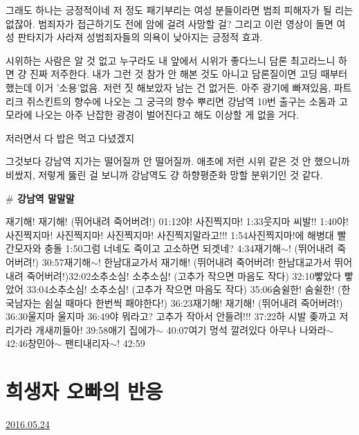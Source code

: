 그래도 하나는 긍정적이네
저 정도 패기부리는 여성 분들이라면 범죄 피해자가 될 리는 없잖아.
범죄자가 접근하기도 전에 암에 걸려 사망할 걸?
그리고 이런 영상이 돌면 여성 판타지가 사라져 성범죄자들의 의욕이 낮아지는 긍정적 효과.
\vspace{5mm}

시위하는 사람은 알 것 없고 누구라도 내 앞에서 시위가 좋다느니 담론 최고라느니 하면 걍 진짜 저주한다.
내가 그런 것 참가 안 해본 것도 아니고 담론질이면 고딩 때부터 했는데 이거 '소용'없음.
저런 짓 해보았자 남는 건 없거든. 아주 광기에 빠져있음, 파트리크 쥐스킨트의 향수에 나오는 그 궁극의 향수 뿌리면
강남역 10번 출구는 소돔과 고모라에 나오는 아주 난잡한 광경이 벌어진다고 해도 이상할 게 없을 거다.
\vspace{5mm}

저러면서 다 밥은 먹고 다녔겠지
\vspace{5mm}

그것보다 강남역 지가는 떨어질까 안 떨어질까.
애초에 저런 시위 같은 것 안 했으니까 비쌌지, 저렇게 뚫린 걸 보니까 강남역도 걍 하향평준화 망할 분위기인 것 같다.
\vspace{5mm}

\textbf{$\#$ 강남역 말말말}
\vspace{5mm}

재기해! 재기해! (뛰어내려 죽어버려!) 01:12야! 사진찍지마! 1:33웃지마 씨발!! 1:40야! 사진찍지마! 사진찍지마! 사진찍지마! 사진찍지말라고!!! 1:54사진찍지마!에 해병대 빨간모자와 충돌 1:50그럼 너네도 죽이고 고소하면 되겟네? 4:34재기해$\sim$! (뛰어내려 죽어버려!) 30:57재기해$\sim$! 한남대교가서 재기해! (뛰어내려 죽어버려! 한남대교가서 뛰어내려 죽어버려!)32:02소추소심! 소추소심! (고추가 작으면 마음도 작다) 32:10빻았다 빻았어 33:04소추소심! 소추소심! (고추가 작으면 마음도 작다) 35:06숨쉴한! 숨쉴한! (한국남자는 쉼실 때마다 한번씩 패야한다!) 36:23재기해! 재기해! (뛰어내려 죽어버려!) 36:30울지마 울지마 36:49야 뭐라고? 고추가 작아서 안들려!!! 37:22하 시발 좆까고 저리가라 개새끼들아! 39:58애기 집에가$\sim$ 40:07여기 멍석 깔려있다 아무나 나와라$\sim$ 42:46창민아$\sim$ 팬티내리자$\sim$! 42:59
\vspace{5mm}



\section{희생자 오빠의 반응}
\href{https://www.kockoc.com/Apoc/790615}{2016.05.24}


